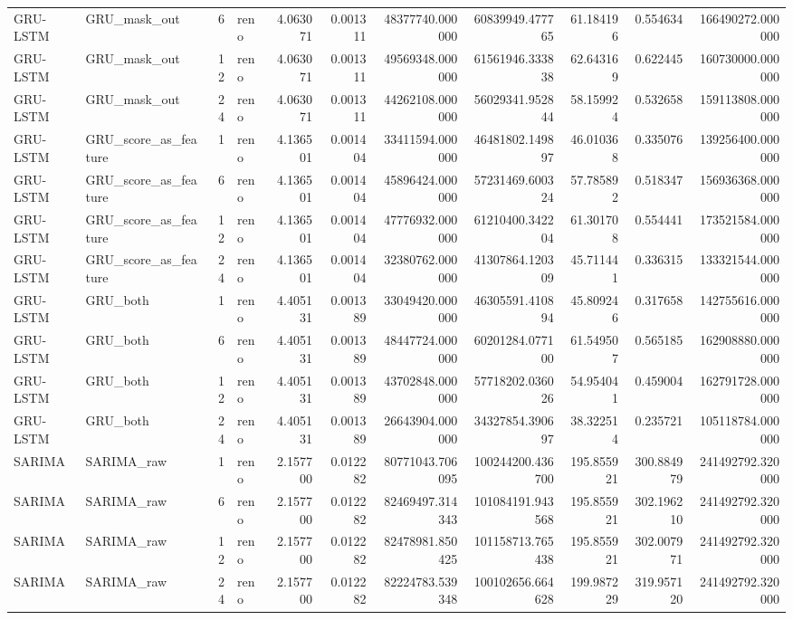 \begin{longtable}{llrlrrrrrrr}
GRU-LSTM & GRU\_mask\_out & 6 & reno & 4.063071 & 0.001311 & 48377740.000000 & 60839949.477765 & 61.184196 & 0.554634 & 166490272.000000 \\
GRU-LSTM & GRU\_mask\_out & 12 & reno & 4.063071 & 0.001311 & 49569348.000000 & 61561946.333838 & 62.643169 & 0.622445 & 160730000.000000 \\
GRU-LSTM & GRU\_mask\_out & 24 & reno & 4.063071 & 0.001311 & 44262108.000000 & 56029341.952844 & 58.159924 & 0.532658 & 159113808.000000 \\
GRU-LSTM & GRU\_score\_as\_feature & 1 & reno & 4.136501 & 0.001404 & 33411594.000000 & 46481802.149897 & 46.010368 & 0.335076 & 139256400.000000 \\
GRU-LSTM & GRU\_score\_as\_feature & 6 & reno & 4.136501 & 0.001404 & 45896424.000000 & 57231469.600324 & 57.785892 & 0.518347 & 156936368.000000 \\
GRU-LSTM & GRU\_score\_as\_feature & 12 & reno & 4.136501 & 0.001404 & 47776932.000000 & 61210400.342204 & 61.301708 & 0.554441 & 173521584.000000 \\
GRU-LSTM & GRU\_score\_as\_feature & 24 & reno & 4.136501 & 0.001404 & 32380762.000000 & 41307864.120309 & 45.711441 & 0.336315 & 133321544.000000 \\
GRU-LSTM & GRU\_both & 1 & reno & 4.405131 & 0.001389 & 33049420.000000 & 46305591.410894 & 45.809246 & 0.317658 & 142755616.000000 \\
GRU-LSTM & GRU\_both & 6 & reno & 4.405131 & 0.001389 & 48447724.000000 & 60201284.077100 & 61.549507 & 0.565185 & 162908880.000000 \\
GRU-LSTM & GRU\_both & 12 & reno & 4.405131 & 0.001389 & 43702848.000000 & 57718202.036026 & 54.954041 & 0.459004 & 162791728.000000 \\
GRU-LSTM & GRU\_both & 24 & reno & 4.405131 & 0.001389 & 26643904.000000 & 34327854.390697 & 38.322514 & 0.235721 & 105118784.000000 \\
SARIMA & SARIMA\_raw & 1 & reno & 2.157700 & 0.012282 & 80771043.706095 & 100244200.436700 & 195.855921 & 300.884979 & 241492792.320000 \\
SARIMA & SARIMA\_raw & 6 & reno & 2.157700 & 0.012282 & 82469497.314343 & 101084191.943568 & 195.855921 & 302.196210 & 241492792.320000 \\
SARIMA & SARIMA\_raw & 12 & reno & 2.157700 & 0.012282 & 82478981.850425 & 101158713.765438 & 195.855921 & 302.007971 & 241492792.320000 \\
SARIMA & SARIMA\_raw & 24 & reno & 2.157700 & 0.012282 & 82224783.539348 & 100102656.664628 & 199.987229 & 319.957120 & 241492792.320000 \\

\end{longtable}
